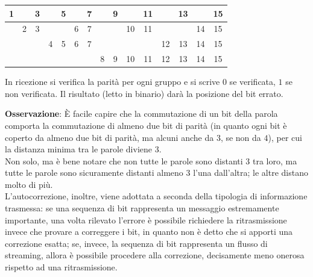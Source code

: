 \documentclass[a4paper]{extarticle}
\renewcommand\arraystretch{}
\begin{document}
\noindent
\begin{table}[H]
\setlength{\tabcolsep}{4pt}
\renewcommand{\arraystretch}{1.2}
\centering
\begin{tabular}{|c|c|c|c|c|c|c|c|c|c|c|c|c|c|c|}
    \hline
    \cellcolor{yellow!25!white} 1 & & 3 & & 5 & & 7 & & 9 & & 11 & & 13 & & 15\\
    \hline
    & \cellcolor{yellow!25!white} 2 & 3 & & & 6 & 7 & & & 10 & 11 & & & 14 & 15\\
    \hline
    & & & \cellcolor{yellow!25!white} 4 & 5 & 6 & 7 & & & & & 12 & 13 & 14 & 15\\
    \hline
    & & & & & & & \cellcolor{yellow!25!white} 8 & 9 & 10 & 11 & 12 & 13 & 14 & 15\\
    \hline
\end{tabular}
\end{table}

\vspace{1em}
\noindent
In ricezione si verifica la parità per ogni gruppo e si scrive $0$ se verificata, $1$ se non verificata. Il risultato (letto in binario) darà la posizione del bit errato.

\vspace{1em}
\noindent
\textbf{Osservazione}: È facile capire che la commutazione di un bit della parola comporta la commutazione di almeno due bit di parità (in quanto ogni bit è coperto da almeno due bit di parità, ma alcuni anche da $3$, se non da $4$), per cui la distanza minima tra le parole diviene $3$.\\
Non solo, ma è bene notare che non tutte le parole sono distanti $3$ tra loro, ma tutte le parole sono sicuramente distanti almeno $3$ l'una dall'altra; le altre distano molto di più.\\
L'autocorrezione, inoltre, viene adottata a seconda della tipologia di informazione trasmessa: se una sequenza di bit rappresenta un messaggio estremamente importante, una volta rilevato l'errore è possibile richiedere la ritrasmissione invece che provare a correggere i bit, in quanto non è detto che si apporti una correzione esatta; se, invece, la sequenza di bit rappresenta un flusso di streaming, allora è possibile procedere alla correzione, decisamente meno onerosa rispetto ad una ritrasmissione.
\end{document}
